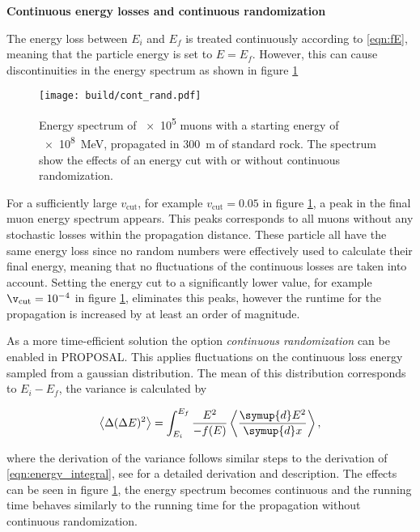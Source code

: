 \textbf{Continuous energy losses and continuous randomization}

The energy loss between $E_i$ and $E_f$ is treated continuously according to \eqref{eqn:fE}, meaning that the particle energy is set to $E = E_f$.
However, this can cause discontinuities in the energy spectrum as shown in figure \ref{fig:cont_rand}

\begin{figure}
    \centering
    \texttt{[image: build/cont\_rand.pdf]}
    \caption[]{Energy spectrum of \num{e5} muons with a starting energy of \SI{e8}{\mega\electronvolt}, propagated in \SI{300}{\meter} of standard rock\footnotemark. The spectrum show the effects of an energy cut with or without continuous randomization.}
    \label{fig:cont_rand}
\end{figure}

For a sufficiently large $v_\text{cut}$, for example $v_\text{cut} = 0.05$ in figure \ref{fig:cont_rand}, a peak in the final muon energy spectrum appears.
This peaks corresponds to all muons without any stochastic losses within the propagation distance.
These particle all have the same energy loss since no random numbers were effectively used to calculate their final energy, meaning that no fluctuations of the continuous losses are taken into account.
Setting the energy cut to a significantly lower value, for example $\v_\text{cut} = \num{e-4}$ in figure \ref{fig:cont_rand}, eliminates this peaks, however the runtime for the propagation is increased by at least an order of magnitude.

As a more time-efficient solution the option \emph{continuous randomization} can be enabled in PROPOSAL.
This applies fluctuations on the continuous loss energy sampled from a gaussian distribution.
The mean of this distribution corresponds to $E_i - E_f$, the variance is calculated by

\begin{equation}
	\left< \Delta (\Delta E)^2 \right> = \int_{E_i}^{E_f} \frac{E^2}{-f(E)} \left< \frac{\symup{d}E^2}{\symup{d}x} \right>,
\end{equation}

where the derivation of the variance follows similar steps to the derivation of \eqref{eqn:energy_integral}, see \cite{chirkin2004propagating} for a detailed derivation and description. 
The effects can be seen in figure \ref{fig:cont_rand}, the energy spectrum becomes continuous and the running time behaves similarly to the running time for the propagation without continuous randomization.

